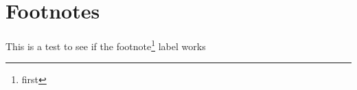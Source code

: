 \documentclass[12pt]{article}
\begin{document}
\section{Footnotes}

This is a test to see if the footnote\footnote{\label{test}first} label works
\end{document}
